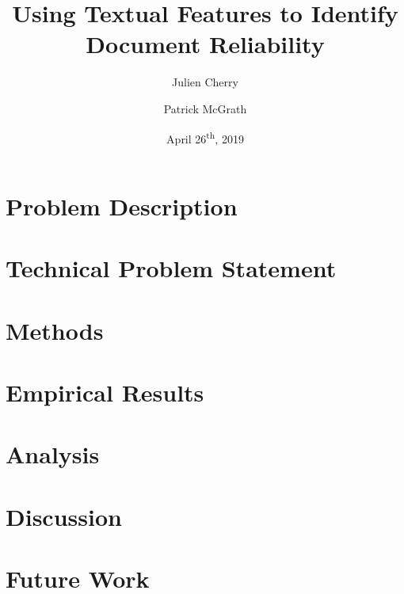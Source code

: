 \documentclass[12pt]{article}
\title{Using Textual Features to Identify Document Reliability}
\author{Julien Cherry \and Patrick McGrath}
\date{April 26\textsuperscript{th}, 2019}
\begin{document}
	\maketitle
	\section{Problem Description}
	\section{Technical Problem Statement}
	\section{Methods}
	\section{Empirical Results}
	\section{Analysis}
	\section{Discussion}
	\section{Future Work}
\end{document}

